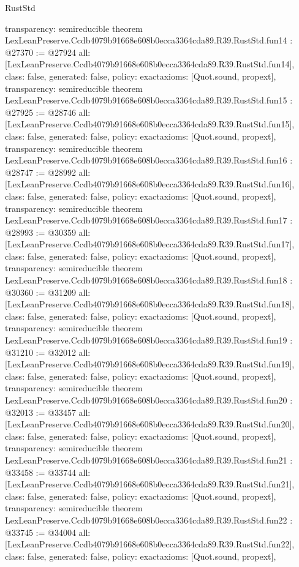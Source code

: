 \begin{lexlean}{RustStd}
\begin{coremodule}
{  transparency: semireducible
}
theorem LexLeanPreserve.Ccdb4079b91668e608b0ecca3364cda89.R39.RustStd.fun14 : @27370 := @27924 {
  all: [LexLeanPreserve.Ccdb4079b91668e608b0ecca3364cda89.R39.RustStd.fun14],
  class: false,
  generated: false,
  policy: exact{axioms: [Quot.sound, propext]},
  transparency: semireducible
}
theorem LexLeanPreserve.Ccdb4079b91668e608b0ecca3364cda89.R39.RustStd.fun15 : @27925 := @28746 {
  all: [LexLeanPreserve.Ccdb4079b91668e608b0ecca3364cda89.R39.RustStd.fun15],
  class: false,
  generated: false,
  policy: exact{axioms: [Quot.sound, propext]},
  transparency: semireducible
}
theorem LexLeanPreserve.Ccdb4079b91668e608b0ecca3364cda89.R39.RustStd.fun16 : @28747 := @28992 {
  all: [LexLeanPreserve.Ccdb4079b91668e608b0ecca3364cda89.R39.RustStd.fun16],
  class: false,
  generated: false,
  policy: exact{axioms: [Quot.sound, propext]},
  transparency: semireducible
}
theorem LexLeanPreserve.Ccdb4079b91668e608b0ecca3364cda89.R39.RustStd.fun17 : @28993 := @30359 {
  all: [LexLeanPreserve.Ccdb4079b91668e608b0ecca3364cda89.R39.RustStd.fun17],
  class: false,
  generated: false,
  policy: exact{axioms: [Quot.sound, propext]},
  transparency: semireducible
}
theorem LexLeanPreserve.Ccdb4079b91668e608b0ecca3364cda89.R39.RustStd.fun18 : @30360 := @31209 {
  all: [LexLeanPreserve.Ccdb4079b91668e608b0ecca3364cda89.R39.RustStd.fun18],
  class: false,
  generated: false,
  policy: exact{axioms: [Quot.sound, propext]},
  transparency: semireducible
}
theorem LexLeanPreserve.Ccdb4079b91668e608b0ecca3364cda89.R39.RustStd.fun19 : @31210 := @32012 {
  all: [LexLeanPreserve.Ccdb4079b91668e608b0ecca3364cda89.R39.RustStd.fun19],
  class: false,
  generated: false,
  policy: exact{axioms: [Quot.sound, propext]},
  transparency: semireducible
}
theorem LexLeanPreserve.Ccdb4079b91668e608b0ecca3364cda89.R39.RustStd.fun20 : @32013 := @33457 {
  all: [LexLeanPreserve.Ccdb4079b91668e608b0ecca3364cda89.R39.RustStd.fun20],
  class: false,
  generated: false,
  policy: exact{axioms: [Quot.sound, propext]},
  transparency: semireducible
}
theorem LexLeanPreserve.Ccdb4079b91668e608b0ecca3364cda89.R39.RustStd.fun21 : @33458 := @33744 {
  all: [LexLeanPreserve.Ccdb4079b91668e608b0ecca3364cda89.R39.RustStd.fun21],
  class: false,
  generated: false,
  policy: exact{axioms: [Quot.sound, propext]},
  transparency: semireducible
}
theorem LexLeanPreserve.Ccdb4079b91668e608b0ecca3364cda89.R39.RustStd.fun22 : @33745 := @34004 {
  all: [LexLeanPreserve.Ccdb4079b91668e608b0ecca3364cda89.R39.RustStd.fun22],
  class: false,
  generated: false,
  policy: exact{axioms: [Quot.sound, propext]},
}
\end{coremodule}
\end{lexlean}
